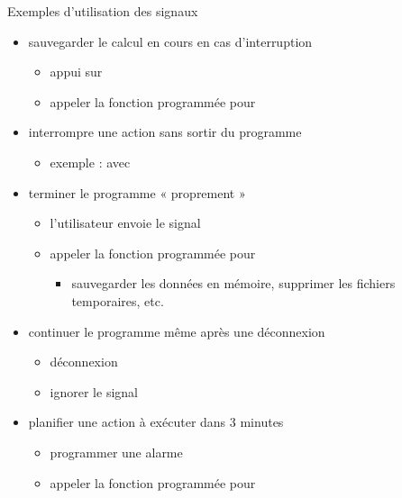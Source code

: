 \begin {frame} {Exemples d'utilisation des signaux}

    \begin {itemize}
	\item sauvegarder le calcul en cours en cas d'interruption
	    \begin {itemize}
		\item appui sur 
		    \implique {}
		\item appeler la fonction programmée pour 
	    \end {itemize}

	\item interrompre une action sans sortir du programme
	    \begin {itemize}
		\item exemple :  avec 
	    \end {itemize}

	\item terminer le programme « proprement »
	    \begin {itemize}
		\item l'utilisateur envoie le signal 
		\item appeler la fonction programmée pour 
		    \begin {itemize}
			\item sauvegarder les données en mémoire,
			    supprimer les fichiers temporaires, etc.
		    \end {itemize}
	    \end {itemize}

	\item continuer le programme même après une déconnexion
	    \begin {itemize}
		\item déconnexion \implique {}
		\item ignorer le signal
	    \end {itemize}

	\item planifier une action à exécuter dans 3 minutes
	    \begin {itemize}
		\item programmer une alarme \implique {}
		\item appeler la fonction programmée pour 
	    \end {itemize}
    \end {itemize}
\end {frame}

